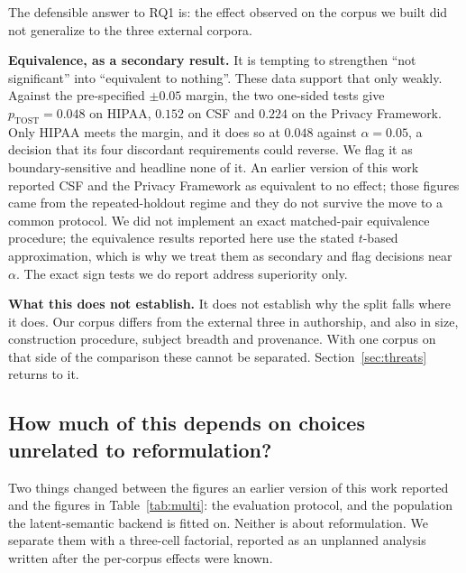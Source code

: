 \documentclass[smallextended,natbib]{svjour3}
\begin{document}
The defensible answer to RQ1 is: the effect observed on the corpus we built did not generalize to the three external corpora.

\noindent\textbf{Equivalence, as a secondary result.}
It is tempting to strengthen ``not significant'' into ``equivalent to nothing''. These data support that only weakly. Against the pre-specified $\pm 0.05$ margin, the two one-sided tests give $p_{\text{TOST}} = 0.048$ on HIPAA, $0.152$ on CSF and $0.224$ on the Privacy Framework. Only HIPAA meets the margin, and it does so at $0.048$ against $\alpha = 0.05$, a decision that its four discordant requirements could reverse. We flag it as boundary-sensitive and headline none of it. An earlier version of this work reported CSF and the Privacy Framework as equivalent to no effect; those figures came from the repeated-holdout regime and they do not survive the move to a common protocol. We did not implement an exact matched-pair equivalence procedure; the equivalence results reported here use the stated $t$-based approximation, which is why we treat them as secondary and flag decisions near $\alpha$. The exact sign tests we do report address superiority only.

\noindent\textbf{What this does not establish.}
It does not establish why the split falls where it does. Our corpus differs from the external three in authorship, and also in size, construction procedure, subject breadth and provenance. With one corpus on that side of the comparison these cannot be separated. Section~\ref{sec:threats} returns to it.

\subsection{How much of this depends on choices unrelated to reformulation?}
\label{sec:results-lsi}

Two things changed between the figures an earlier version of this work reported and the figures in Table~\ref{tab:multi}: the evaluation protocol, and the population the latent-semantic backend is fitted on. Neither is about reformulation. We separate them with a three-cell factorial, reported as an unplanned analysis written after the per-corpus effects were known.
\end{document}
